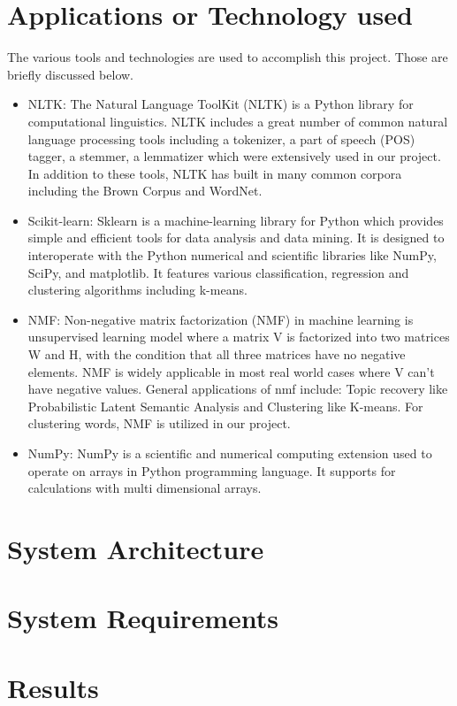 \documentclass[12pt]{article}
\begin{document}
\section{Applications or Technology used}
The various tools and technologies are used to accomplish this project. Those are briefly discussed below.
\begin{itemize}
\item{NLTK}: The Natural Language ToolKit (NLTK) is a Python library for computational linguistics. NLTK includes a great number of common natural language processing tools including a tokenizer, a part of speech (POS) tagger, a stemmer, a lemmatizer which were extensively used in our project.  In addition to these tools, NLTK has built in many common corpora including the Brown Corpus and WordNet.
\item{Scikit-learn}: Sklearn is a machine-learning library for Python which provides simple and efficient tools for data analysis and data mining. It is designed to interoperate with the Python numerical and scientific libraries like NumPy, SciPy, and matplotlib. It features various classification, regression and clustering algorithms including k-means.
\item{NMF}: Non-negative matrix factorization (NMF) in machine learning is unsupervised learning model  where a matrix V is factorized into two matrices W and H, with the condition that all three matrices have no negative elements. NMF is widely applicable in most real world cases where V can't have negative values. General applications of nmf include: Topic recovery like Probabilistic Latent Semantic Analysis and Clustering like K-means. For clustering words, NMF is utilized in our project.
\item{NumPy}: NumPy is a scientific and numerical computing extension used to operate on arrays in Python programming language. It supports for calculations with multi dimensional arrays.
\end{itemize}

\section{System Architecture}
\section{System Requirements}
\section{Results}
\end{document}
